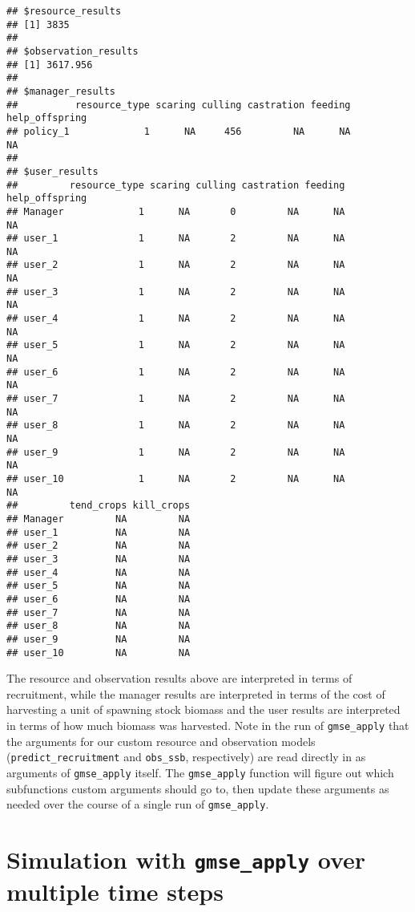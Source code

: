 \documentclass[]{article}
\begin{document}
\begin{verbatim}
## $resource_results
## [1] 3835
## 
## $observation_results
## [1] 3617.956
## 
## $manager_results
##          resource_type scaring culling castration feeding help_offspring
## policy_1             1      NA     456         NA      NA             NA
## 
## $user_results
##         resource_type scaring culling castration feeding help_offspring
## Manager             1      NA       0         NA      NA             NA
## user_1              1      NA       2         NA      NA             NA
## user_2              1      NA       2         NA      NA             NA
## user_3              1      NA       2         NA      NA             NA
## user_4              1      NA       2         NA      NA             NA
## user_5              1      NA       2         NA      NA             NA
## user_6              1      NA       2         NA      NA             NA
## user_7              1      NA       2         NA      NA             NA
## user_8              1      NA       2         NA      NA             NA
## user_9              1      NA       2         NA      NA             NA
## user_10             1      NA       2         NA      NA             NA
##         tend_crops kill_crops
## Manager         NA         NA
## user_1          NA         NA
## user_2          NA         NA
## user_3          NA         NA
## user_4          NA         NA
## user_5          NA         NA
## user_6          NA         NA
## user_7          NA         NA
## user_8          NA         NA
## user_9          NA         NA
## user_10         NA         NA
\end{verbatim}

The resource and observation results above are interpreted in terms of
recruitment, while the manager results are interpreted in terms of the
cost of harvesting a unit of spawning stock biomass and the user results
are interpreted in terms of how much biomass was harvested. Note in the
run of \texttt{gmse\_apply} that the arguments for our custom resource
and observation models (\texttt{predict\_recruitment} and
\texttt{obs\_ssb}, respectively) are read directly in as arguments of
\texttt{gmse\_apply} itself. The \texttt{gmse\_apply} function will
figure out which subfunctions custom arguments should go to, then update
these arguments as needed over the course of a single run of
\texttt{gmse\_apply}.

\section{\texorpdfstring{Simulation with \texttt{gmse\_apply} over
multiple time
steps}{Simulation with gmse\_apply over multiple time steps}}\label{simulation-with-gmse_apply-over-multiple-time-steps}
\end{document}
